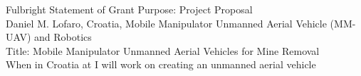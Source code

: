 \documentclass[12pt]{article}
\begin{document}
Fulbright Statement of Grant Purpose: Project Proposal\\
Daniel M. Lofaro, Croatia, Mobile Manipulator Unmanned Aerial Vehicle (MM-UAV) and Robotics\\
Title: Mobile Manipulator Unmanned Aerial Vehicles for Mine Removal\\

When in Croatia at I will work on creating an unmanned aerial vehicle 
\end{document}
